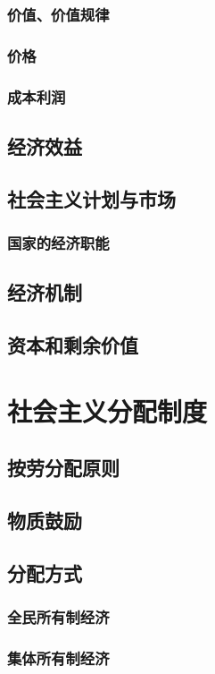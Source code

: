 \documentclass[UTF8]{../../RepresentationUniverse}
\begin{document}
        \subsubsection{价值、价值规律}
        \subsubsection{价格}
        \subsubsection{成本利润}
    \subsection{经济效益}
    \subsection{社会主义计划与市场}
        \subsubsection{国家的经济职能}
    \subsection{经济机制}
    \subsection{资本和剩余价值}
\section{社会主义分配制度}
    \subsection{按劳分配原则}
    \subsection{物质鼓励}
    \subsection{分配方式}
        \subsubsection{全民所有制经济}
        \subsubsection{集体所有制经济}
\end{document}

